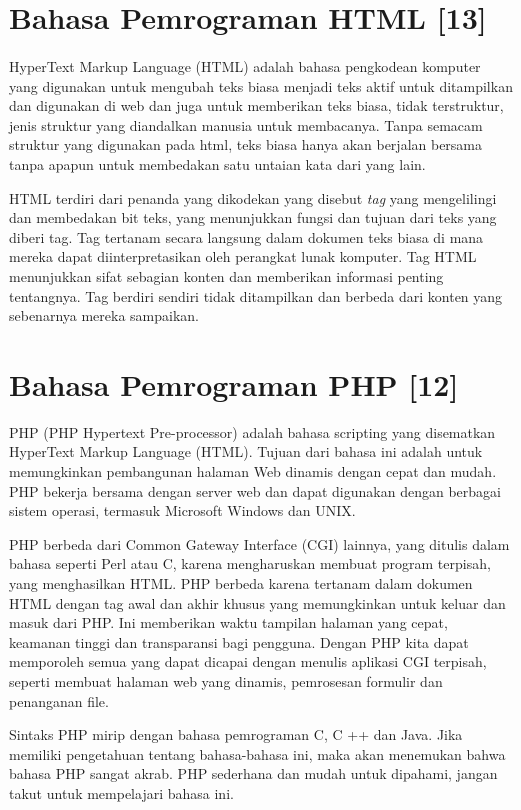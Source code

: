 \section{Bahasa Pemrograman HTML [13]}
\label{html}
\paragraph{}
HyperText Markup Language (HTML) adalah bahasa pengkodean komputer yang digunakan untuk mengubah teks biasa menjadi teks aktif untuk ditampilkan dan digunakan di web dan juga untuk memberikan teks biasa, tidak terstruktur, jenis struktur yang diandalkan manusia untuk membacanya. Tanpa semacam struktur yang digunakan pada html, teks biasa hanya akan berjalan bersama tanpa apapun untuk membedakan satu untaian kata dari yang lain.

HTML terdiri dari penanda yang dikodekan yang disebut \textit{tag} yang mengelilingi dan membedakan bit teks, yang menunjukkan fungsi dan tujuan dari teks yang diberi tag. Tag tertanam secara langsung dalam dokumen teks biasa di mana mereka dapat diinterpretasikan oleh perangkat lunak komputer. Tag HTML menunjukkan sifat sebagian konten dan memberikan informasi penting tentangnya. Tag berdiri sendiri tidak ditampilkan dan berbeda dari konten yang sebenarnya mereka sampaikan.

\section{Bahasa Pemrograman PHP [12]}
\label{php}
PHP (PHP Hypertext Pre-processor) adalah bahasa scripting yang disematkan HyperText Markup Language (HTML). Tujuan dari bahasa ini adalah untuk memungkinkan pembangunan halaman Web dinamis dengan cepat dan mudah. PHP bekerja bersama dengan server web dan dapat digunakan dengan berbagai sistem operasi, termasuk Microsoft Windows dan UNIX.

PHP berbeda dari Common Gateway Interface (CGI) lainnya, yang ditulis dalam bahasa seperti Perl atau C, karena mengharuskan membuat program terpisah, yang menghasilkan HTML. PHP berbeda karena tertanam dalam dokumen HTML dengan tag awal dan akhir khusus yang memungkinkan untuk keluar dan masuk dari PHP. Ini memberikan waktu tampilan halaman yang cepat, keamanan tinggi dan transparansi bagi pengguna. Dengan PHP kita dapat memporoleh semua yang dapat dicapai dengan menulis aplikasi CGI terpisah, seperti membuat halaman web yang dinamis, pemrosesan formulir dan penanganan file.

Sintaks PHP mirip dengan bahasa pemrograman C, C ++ dan Java. Jika  memiliki pengetahuan tentang bahasa-bahasa ini, maka akan menemukan bahwa bahasa PHP sangat akrab. PHP sederhana dan mudah untuk dipahami, jangan takut untuk mempelajari bahasa ini.

